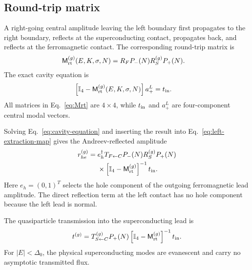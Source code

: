 \subsection{Round-trip matrix}
\label{subsec:round-trip}

A right-going central amplitude leaving the left boundary first propagates to the right boundary, reflects at the superconducting contact, propagates back, and reflects at the ferromagnetic contact.  The corresponding round-trip matrix is
\begin{equation}
\begin{split}
    \mathsf M_{\mathrm{rt}}^{(g)}(E,K,\sigma,N)
    &=
    R_F P_-(N)R_S^{(g)}P_+(N) .
\end{split}
    \label{eq:Mrt}
\end{equation}
The exact cavity equation is
\begin{equation}
\begin{split}
    \left[\mathbb I_4-\mathsf M_{\mathrm{rt}}^{(g)}(E,K,\sigma,N)\right]a_+^L
    &=
    t_{\rm in} .
\end{split}
    \label{eq:cavity-equation}
\end{equation}
All matrices in Eq.~\eqref{eq:Mrt} are $4\times4$, while $t_{\rm in}$ and $a_+^L$ are four-component central modal vectors.

Solving Eq.~\eqref{eq:cavity-equation} and inserting the result into Eq.~\eqref{eq:left-extraction-map} gives the Andreev-reflected amplitude
\begin{equation}
\begin{split}
    r_{he}^{(g)}
    ={}&
    e_h^\dagger
    T_{F\leftarrow C}
    P_-(N)
    R_S^{(g)}P_+(N)
    \\
    &\times
    \left[\mathbb I_4-\mathsf M_{\mathrm{rt}}^{(g)}\right]^{-1}
    t_{\rm in} .
\end{split}
    \label{eq:rhe}
\end{equation}
Here $e_h=(0,1)^T$ selects the hole component of the outgoing ferromagnetic lead amplitude.  The direct reflection term at the left contact has no hole component because the left lead is normal.

The quasiparticle transmission into the superconducting lead is
\begin{equation}
    t^{(g)}
    =
    T_{S\leftarrow C}^{(g)}P_+(N)
    \left[\mathbb I_4-\mathsf M_{\mathrm{rt}}^{(g)}\right]^{-1}t_{\rm in}.
    \label{eq:transmitted-amplitudes}
\end{equation}
For $|E|<\Delta_0$, the physical superconducting modes are evanescent and carry no asymptotic transmitted flux.

